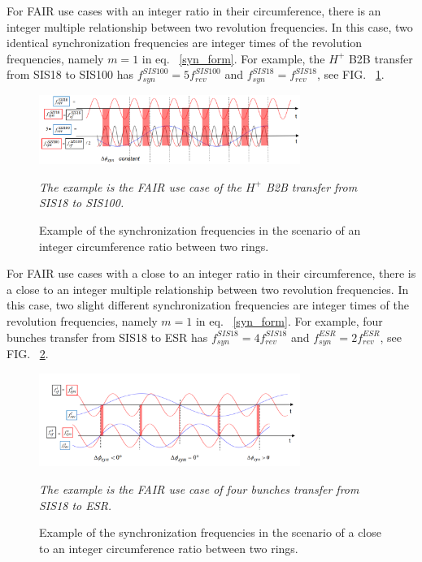 For FAIR use cases with an integer ratio in their circumference, there is an integer multiple relationship between two revolution frequencies. In this case, two identical synchronization frequencies are integer times of the revolution frequencies, namely $m=1$ in eq. ~\ref{syn_form}. For example, the $H^{+}$ B2B transfer from SIS18 to SIS100 has $f_{\mathit{syn}}^{SIS100}=5f_{\mathit{rev}}^{SIS100}$ and $f_{\mathit{syn}}^{SIS18}=f_{\mathit{rev}}^{SIS18}$, see FIG. ~\ref{USIS18}. 
\begin{figure}[!htb]
   \centering   
   \includegraphics*[width=85mm]{USIS18.png}
   \caption{Example of the synchronization frequencies in the scenario of an integer circumference ratio between two rings.}
{\textsl{\small{The example is the FAIR use case of the $H^{+}$ B2B transfer from SIS18 to SIS100.}}}
   \label{USIS18}
\end{figure} 

For FAIR use cases with a close to an integer ratio in their circumference, there is a close to an integer multiple relationship between two revolution frequencies. In this case, two slight different synchronization frequencies are integer times of the revolution frequencies, namely $m=1$ in eq. ~\ref{syn_form}. For example, four bunches transfer from SIS18 to ESR has $f_{\mathit{syn}}^{SIS18}=4f_{\mathit{rev}}^{SIS18}$ and $f_{\mathit{syn}}^{ESR}=2f_{\mathit{rev}}^{ESR}$, see FIG. ~\ref{ESR}. 
\begin{figure}[!htb]
   \centering   
   \includegraphics*[width=85mm]{cir_noint.jpg}
   \caption{Example of the synchronization frequencies in the scenario of a close to an integer circumference ratio between two rings.}
{\textsl{\small{The example is the FAIR use case of four bunches transfer from SIS18 to ESR.}}}
   \label{ESR}
\end{figure} 

